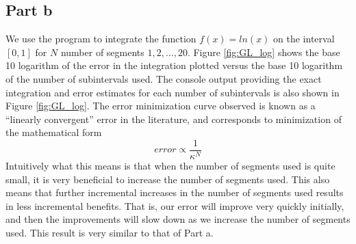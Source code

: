 \documentclass[11pt]{article}
\begin{document}
\FloatBarrier
\subsection*{Part b}
We use the program to integrate the function $f(x) = ln(x)$ on the interval $[0, 1]$ for $N$ number of segments $1, 2, \ldots , 20$. Figure \ref{fig:GL_log} shows the base 10 logarithm of the error in the integration plotted versus the base 10 logarithm of the number of subintervals used. The console output providing the exact integration and error estimates for each number of subintervals is also shown in Figure \ref{fig:GL_log}. The error minimization curve observed is known as a ``linearly convergent'' error in the literature, and corresponds to minimization of the mathematical form
$$ error \propto \frac{1}{\kappa^N} $$
Intuitively what this means is that when the number of segments used is quite small, it is very beneficial to increase the number of segments used. This also means that further incremental increases in the number of segments used results in less incremental benefits. That is, our error will improve very quickly initially, and then the improvements will slow down as we increase the number of segments used. This result is very similar to that of Part a.
\end{document}
